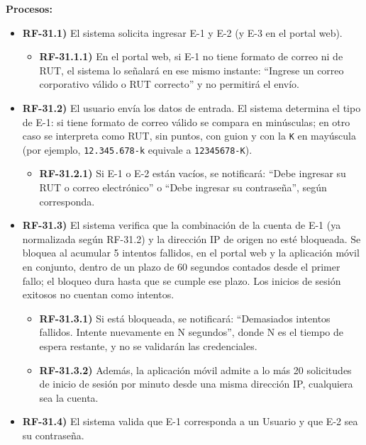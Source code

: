 \textbf{Procesos:}
\begin{itemize}[label={}, leftmargin=1.5em]
  \item \textbf{RF-31.1)} El sistema solicita ingresar E-1 y E-2 (y E-3 en el portal web).
  \begin{itemize}[label={}, leftmargin=1.5em]
    \item \textbf{RF-31.1.1)} En el portal web, si E-1 no tiene formato de correo ni de RUT, el sistema lo se\~nalar\'a en ese mismo instante: ``Ingrese un correo corporativo v\'alido o RUT correcto'' y no permitir\'a el env\'io.
  \end{itemize}
  \item \textbf{RF-31.2)} El usuario env\'ia los datos de entrada. El sistema determina el tipo de E-1: si tiene formato de correo v\'alido se compara en min\'usculas; en otro caso se interpreta como RUT, sin puntos, con guion y con la \texttt{K} en may\'uscula (por ejemplo, \texttt{12.345.678-k} equivale a \texttt{12345678-K}).
  \begin{itemize}[label={}, leftmargin=1.5em]
    \item \textbf{RF-31.2.1)} Si E-1 o E-2 est\'an vac\'ios, se notificar\'a: ``Debe ingresar su RUT o correo electr\'onico'' o ``Debe ingresar su contrase\~na'', seg\'un corresponda.
  \end{itemize}
  \item \textbf{RF-31.3)} El sistema verifica que la combinaci\'on de la cuenta de E-1 (ya normalizada seg\'un RF-31.2) y la direcci\'on IP de origen no est\'e bloqueada. Se bloquea al acumular 5 intentos fallidos, en el portal web y la aplicaci\'on m\'ovil en conjunto, dentro de un plazo de 60 segundos contados desde el primer fallo; el bloqueo dura hasta que se cumple ese plazo. Los inicios de sesi\'on exitosos no cuentan como intentos.
  \begin{itemize}[label={}, leftmargin=1.5em]
    \item \textbf{RF-31.3.1)} Si est\'a bloqueada, se notificar\'a: ``Demasiados intentos fallidos. Intente nuevamente en N segundos'', donde N es el tiempo de espera restante, y no se validar\'an las credenciales.
    \item \textbf{RF-31.3.2)} Adem\'as, la aplicaci\'on m\'ovil admite a lo m\'as 20 solicitudes de inicio de sesi\'on por minuto desde una misma direcci\'on IP, cualquiera sea la cuenta.
  \end{itemize}
  \item \textbf{RF-31.4)} El sistema valida que E-1 corresponda a un Usuario y que E-2 sea su contrase\~na.

\end{itemize}
